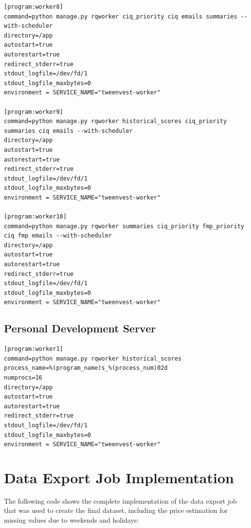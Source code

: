 \documentclass[11pt,english,a4paper,hidelinks]{book}
\begin{document}
\begin{lstlisting}[language={}, caption=Production Workers Management, label={lst:tweenvest_production_workers_management}]
[program:worker8]
command=python manage.py rqworker ciq_priority ciq emails summaries --with-scheduler
directory=/app
autostart=true
autorestart=true
redirect_stderr=true
stdout_logfile=/dev/fd/1
stdout_logfile_maxbytes=0
environment = SERVICE_NAME="tweenvest-worker"

[program:worker9]
command=python manage.py rqworker historical_scores ciq_priority summaries ciq emails --with-scheduler
directory=/app
autostart=true
autorestart=true
redirect_stderr=true
stdout_logfile=/dev/fd/1
stdout_logfile_maxbytes=0
environment = SERVICE_NAME="tweenvest-worker"

[program:worker10]
command=python manage.py rqworker summaries ciq_priority fmp_priority ciq fmp emails --with-scheduler
directory=/app
autostart=true
autorestart=true
redirect_stderr=true
stdout_logfile=/dev/fd/1
stdout_logfile_maxbytes=0
environment = SERVICE_NAME="tweenvest-worker"
\end{lstlisting}

\subsection{Personal Development Server}
\begin{lstlisting}[language={}, caption=Hetzner Workers Management, label={lst:hetzner_workers_management}]
[program:worker1]
command=python manage.py rqworker historical_scores
process_name=%(program_name)s_%(process_num)02d
numprocs=16
directory=/app
autostart=true
autorestart=true
redirect_stderr=true
stdout_logfile=/dev/fd/1
stdout_logfile_maxbytes=0
environment = SERVICE_NAME="tweenvest-worker"
\end{lstlisting}


\section{Data Export Job Implementation}
\label{app:data_export_job}

\noindent The following code shows the complete implementation of the data export job that was used to create the final dataset, including the price estimation for missing values due to weekends and holidays:
\end{document}
